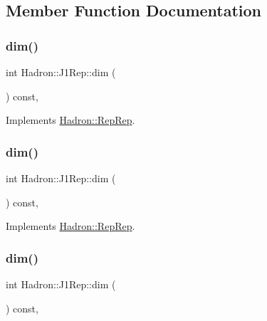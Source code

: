 \subsection{Member Function Documentation}
\mbox{\label{structHadron_1_1J1Rep_a59c9039238a259026aa68b2c30b3822a}} 
\subsubsection{\texorpdfstring{dim()}{dim()}\hspace{0.1cm}{\footnotesize\ttfamily [1/5]}}
{\footnotesize\ttfamily int Hadron\+::\+J1\+Rep\+::dim (\begin{DoxyParamCaption}{ }\end{DoxyParamCaption}) const\hspace{0.3cm}{\ttfamily [inline]}, {\ttfamily [virtual]}}



Implements \mbox{\hyperlink{structHadron_1_1RepRep_a92c8802e5ed7afd7da43ccfd5b7cd92b}{Hadron\+::\+Rep\+Rep}}.

\mbox{\label{structHadron_1_1J1Rep_a59c9039238a259026aa68b2c30b3822a}} 
\subsubsection{\texorpdfstring{dim()}{dim()}\hspace{0.1cm}{\footnotesize\ttfamily [2/5]}}
{\footnotesize\ttfamily int Hadron\+::\+J1\+Rep\+::dim (\begin{DoxyParamCaption}{ }\end{DoxyParamCaption}) const\hspace{0.3cm}{\ttfamily [inline]}, {\ttfamily [virtual]}}



Implements \mbox{\hyperlink{structHadron_1_1RepRep_a92c8802e5ed7afd7da43ccfd5b7cd92b}{Hadron\+::\+Rep\+Rep}}.

\mbox{\label{structHadron_1_1J1Rep_a59c9039238a259026aa68b2c30b3822a}} 
\subsubsection{\texorpdfstring{dim()}{dim()}\hspace{0.1cm}{\footnotesize\ttfamily [3/5]}}
{\footnotesize\ttfamily int Hadron\+::\+J1\+Rep\+::dim (\begin{DoxyParamCaption}{ }\end{DoxyParamCaption}) const\hspace{0.3cm}{\ttfamily [inline]}, {\ttfamily [virtual]}}




